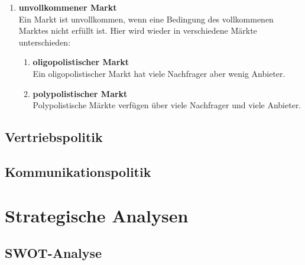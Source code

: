 \begin{flushleft}
\begin{enumerate}
{\begin{enumerate}
{\begin{enumerate}
                        \item Der Markt reagiert sofort
                        \item Marktteilnehmer sind rational
                    \end{enumerate}
                    Im vollkommenen Markt liegt ein Gleichgewichtspreis vor. Der Gleichgewichtspreis ist der Schnittpunkt zwischen der Angebots- und der Nachfragekurve.
                    Ein vollkommener Markt ist ein rein theoretisches Modell.
                }
                \item {
                    \textbf{unvollkommener Markt} \\
                    Ein Markt ist unvollkommen, wenn eine Bedingung des vollkommenen Marktes nicht erfüllt ist.
                    Hier wird wieder in verschiedene Märkte unterschieden:
                    \begin{enumerate}
                        \item {
                            \textbf{oligopolistischer Markt} \\
                            Ein oligopolistischer Markt hat viele Nachfrager aber wenig Anbieter.
                        }
                        \item {
                            \textbf{polypolistischer Markt} \\
                            Polypolistische Märkte verfügen über viele Nachfrager und viele Anbieter.
                        }
                    \end{enumerate}
                }
            \end{enumerate} 
        }
    \end{enumerate}
\end{flushleft}

\subsection{Vertriebspolitik}
\subsection{Kommunikationspolitik}

\section{Strategische Analysen}
\subsection{SWOT-Analyse}
